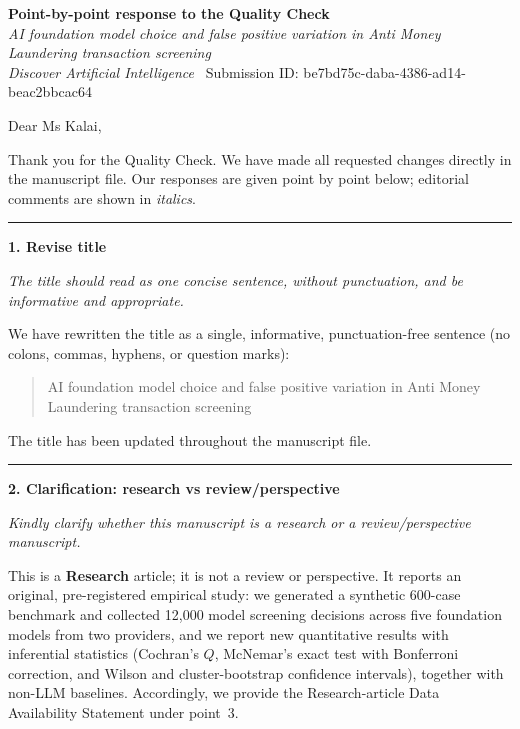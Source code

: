 \documentclass[11pt]{article}
\begin{document}
\begin{center}
{\large\bfseries Point-by-point response to the Quality Check}\\[3pt]
{\itshape AI foundation model choice and false positive variation in Anti Money Laundering transaction screening}\\[2pt]
{\small \emph{Discover Artificial Intelligence} \textbullet\ Submission ID: be7bd75c-daba-4386-ad14-beac2bbcac64}
\end{center}

\vspace{4pt}

Dear Ms Kalai,

Thank you for the Quality Check. We have made all requested changes directly in the manuscript file. Our responses are given point by point below; editorial comments are shown in \emph{italics}.

\vspace{4pt}
\hrule
\vspace{6pt}

\textbf{1. Revise title}

\emph{The title should read as one concise sentence, without punctuation, and be informative and appropriate.}

We have rewritten the title as a single, informative, punctuation-free sentence (no colons, commas, hyphens, or question marks):

\begin{quote}
AI foundation model choice and false positive variation in Anti Money Laundering transaction screening
\end{quote}

The title has been updated throughout the manuscript file.

\vspace{6pt}
\hrule
\vspace{6pt}

\textbf{2. Clarification: research vs review/perspective}

\emph{Kindly clarify whether this manuscript is a research or a review/perspective manuscript.}

This is a \textbf{Research} article; it is not a review or perspective. It reports an original, pre-registered empirical study: we generated a synthetic 600-case benchmark and collected 12,000 model screening decisions across five foundation models from two providers, and we report new quantitative results with inferential statistics (Cochran's $Q$, McNemar's exact test with Bonferroni correction, and Wilson and cluster-bootstrap confidence intervals), together with non-LLM baselines. Accordingly, we provide the Research-article Data Availability Statement under point~3.
\end{document}

